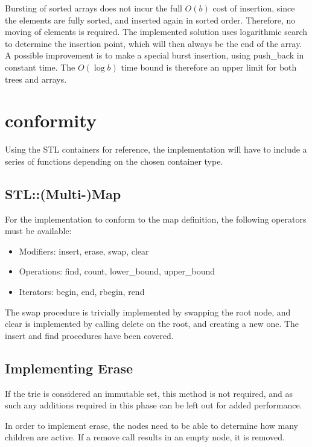 Bursting of sorted arrays does not incur the full $O(b)$ cost of insertion, since
the elements are fully sorted, and inserted again in sorted order. Therefore, no
moving of elements is required. The implemented solution uses logarithmic search
to determine the insertion point, which will then always be the end of the array.
A possible improvement is to make a special burst insertion, using push\_back in
constant time. The $O(\log b)$ time bound is therefore an upper limit for both trees
and arrays.


\section{\STL  conformity}
Using the STL containers for reference, the implementation will have to include
a series of functions depending on the chosen container type.

\subsection{STL::(Multi-)Map}
For the implementation to conform to the map definition, the following operators
must be available:
\begin{itemize}
    \item Modifiers: {\keyword insert}, {\keyword erase}, {\keyword swap},
        {\keyword clear}
    \item Operations: {\keyword find}, {\keyword count}, {\keyword lower\_bound},
        {\keyword upper\_bound}
    \item Iterators: {\keyword begin}, {\keyword end}, {\keyword rbegin},
        {\keyword rend}
\end{itemize}
The {\keyword swap} procedure is trivially implemented by swapping the root
node, and {\keyword clear} is implemented by calling {\keyword delete} on the
root, and creating a new one. The {\keyword insert} and {\keyword find}
procedures have been covered.

\subsection{Implementing Erase}
If the trie is considered an immutable set, this method is not required, and as such
any additions required in this phase can be left out for added performance.

In order to implement {\keyword erase}, the nodes need to be able to determine how many
children are active. If a remove call results in an empty node, it is removed.

